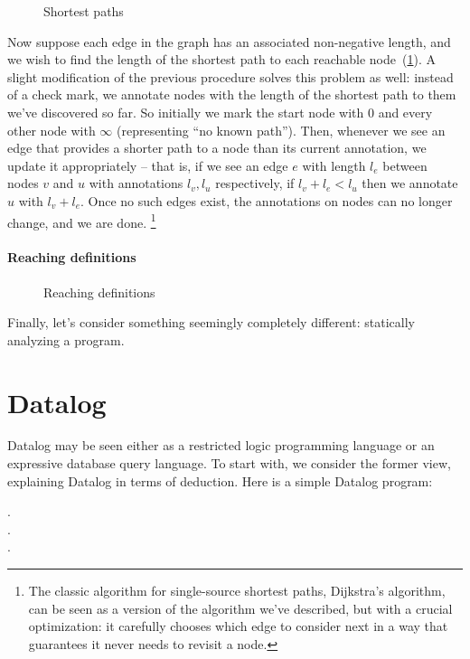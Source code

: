 \begin{figure}
  \XXX
  \caption{Shortest paths}
  \label{figure-shortest-paths}
\end{figure}

Now suppose each edge in the graph has an associated non-negative length, and we
wish to find the length of the shortest path to each reachable
node~(\cref{figure-shortest-paths}). A slight modification of the previous
procedure solves this problem as well: instead of a check mark, we annotate
nodes with the length of the shortest path to them we've discovered so far. So
initially we mark the start node with 0 and every other node with $\infty$
(representing ``no known path''). Then, whenever we see an edge that provides a
shorter path to a node than its current annotation, we update it appropriately
-- that is, if we see an edge $e$ with length $l_e$ between nodes $v$ and $u$
with annotations $l_v, l_u$ respectively, if $l_v + l_e < l_u$ then we annotate
$u$ with $l_v + l_e$. Once no such edges exist, the annotations on nodes can no
longer change, and we are done.%
%
\footnote{The classic algorithm for single-source shortest paths, Dijkstra's
  algorithm, can be seen as a version of the algorithm we've described, but with
  a crucial optimization: it carefully chooses which edge to consider next in a
  way that guarantees it never needs to revisit a node.}


\paragraph{Reaching definitions}

\begin{figure}
  \XXX
  \caption{Reaching definitions}
  \label{figure-reaching-definitions}
\end{figure}

Finally, let's consider something seemingly completely different: statically
analyzing a program.



\section{Datalog}
\label{section-datalog}

Datalog may be seen either as a restricted logic programming language or an
expressive database query language. To start with, we consider the former view,
explaining Datalog in terms of deduction. Here is a simple Datalog program:

\begin{datalog}
  .
  \\
  .
  \\
   \gets {} \conj {}.
\end{datalog}

